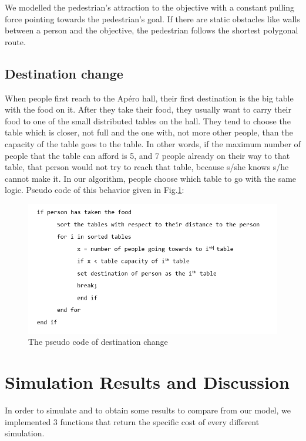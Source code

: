 \documentclass[11pt]{article}
\begin{document}
We modelled the pedestrian's attraction to the objective with a constant pulling force pointing towards the pedestrian's goal. If there are static obstacles like walls between a person and the objective, the pedestrian follows the shortest polygonal route.

\subsection{Destination change}
When people first reach to the Apéro hall, their first destination is the big table with the food on it. After they take their food, they usually want to carry their food to one of the small distributed tables on the hall. They tend to choose the table which is closer, not full and the one with, not more other people, than the capacity of the table goes to the table. In other words, if the maximum number of people that the table can afford is 5, and 7 people already on their way to that table, that person would not try to reach that table, because s/she knows s/he cannot make it. In our algorithm, people choose which table to go with the same logic. Pseudo code of this behavior given in Fig.\ref{fig:sudocode}:

\begin{figure}[ht!]
\centering
\includegraphics[scale=0.7]{sudocode.png}
\caption{The pseudo code of destination change}
\label{fig:sudocode}
\end{figure}

\section{Simulation Results and Discussion}
In order to simulate and to obtain some results to compare from our model, we implemented 3 functions that return the specific cost of every different simulation.
\end{document}
